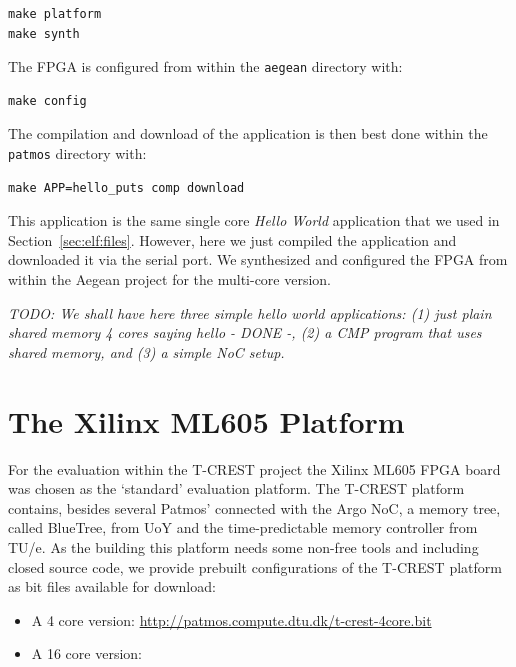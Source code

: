 \documentclass[a4paper,fontsize=10pt,twoside,DIV15,BCOR12mm,headinclude=true,footinclude=false,pagesize,bibtotoc]{scrbook}
\newcommand{\code}[1]{{\texttt{#1}}}
\newcommand{\todo}[1]{{\emph{TODO: #1}}}
\begin{document}
\begin{verbatim}
make platform
make synth
\end{verbatim}

The FPGA is configured from within the \code{aegean} directory with:

\begin{verbatim}
make config
\end{verbatim}

The compilation and download of the application is then best done within
the \code{patmos} directory with:

\begin{verbatim}
make APP=hello_puts comp download
\end{verbatim}

This application is the same single core \emph{Hello World} application that
we used in Section~\ref{sec:elf:files}. However, here we just compiled the
application and downloaded it via the serial port. We synthesized and configured
the FPGA from within the Aegean project for the multi-core version.

\todo{We shall have here three simple hello world applications: (1) just plain shared memory 4 cores saying hello - DONE -,
(2) a CMP program that uses shared memory, and (3) a simple NoC setup.}



\section{The Xilinx ML605 Platform}

For the evaluation within the T-CREST project the Xilinx ML605 FPGA board was chosen as the `standard'
evaluation platform. The T-CREST platform contains, besides several Patmos' connected with the Argo NoC,
a memory tree, called BlueTree, from UoY and the time-predictable memory controller from TU/e. As the
building this platform needs some non-free tools and including closed source code, we provide prebuilt
configurations of the T-CREST platform as bit files available for download:

\begin{itemize}
\item A 4 core version: \url{http://patmos.compute.dtu.dk/t-crest-4core.bit}
\item A 16 core version: 
\end{itemize}
\end{document}

